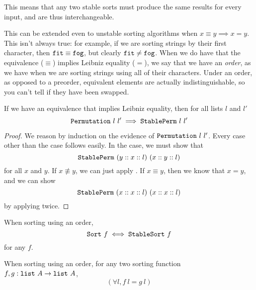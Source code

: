 \documentclass[sigplan,10pt,anonymous,review]{thesis}
\begin{document}
This means that any two stable sorts must produce the same results for
every input, and are thus interchangeable.
\stablesortunique

This can be extended even to unstable sorting algorithms when $x \equiv y
\implies x = y$. This isn't always true: for example, if we are
sorting strings by their first character, then $\text{\texttt{fit}} \equiv
\text{\texttt{fog}}$, but clearly $\text{\texttt{fit}} \neq
\text{\texttt{fog}}$. When we do have that the equivalence ($\equiv$)
implies Leibniz equality ($=$), we say that we have an \textit{order},
as we have when we are sorting strings using all of their characters.
Under an order, as opposed to a preorder, equivalent elements are
actually indistinguishable, so you can't tell if they have been
swapped.

\begin{theorem}
  If we have an equivalence that implies Leibniz equality, then for
  all lists $l$ and $l'$
  \begin{equation*}
    \texttt{\textup{Permutation}}~l~l' \implies \texttt{\textup{StablePerm}}~l~l'
  \end{equation*}
\end{theorem}
\begin{proof}
  We reason by induction on the evidence of $\texttt{\textup{Permutation}}~l~l'$.
  Every case other than the  case follows easily.
  In the  case, we must show that
  \begin{equation*}
    \texttt{\textup{StablePerm}}~(y :: x :: l)~(x :: y :: l)
  \end{equation*}
  for all $x$ and $y$. If $x \not\equiv y$, we can just apply
  . If $x \equiv y$, then we know that $x = y$, and
  we can show
  \begin{equation*}
    \texttt{\textup{StablePerm}}~(x :: x :: l)~(x :: x :: l)
  \end{equation*}
  by applying  twice.
\end{proof}

\begin{corollary}
  \label{thm:stablesort_ord}
  When sorting using an order,
  \begin{equation*}
    \texttt{\textup{Sort}}~f \iff \texttt{\textup{StableSort}}~f
  \end{equation*}
  for any $f$.
\end{corollary}

\begin{corollary}
  \label{thm:sort_ord_unique}
  When sorting using an order, for any two sorting function $f, g:
  \texttt{\textup{list}}~A \to \texttt{\textup{list}}~A$,
  \begin{equation*}
    (\forall l, f~l = g~l)
  \end{equation*}
\end{corollary}
\end{document}
